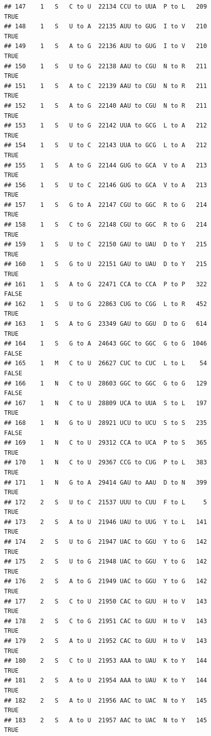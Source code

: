 \documentclass[
  12pt,
]{article}
\begin{document}
\begin{verbatim}
## 147    1   S   C to U  22134 CCU to UUA  P to L   209           TRUE
## 148    1   S   U to A  22135 AUU to GUG  I to V   210           TRUE
## 149    1   S   A to G  22136 AUU to GUG  I to V   210           TRUE
## 150    1   S   U to G  22138 AAU to CGU  N to R   211           TRUE
## 151    1   S   A to C  22139 AAU to CGU  N to R   211           TRUE
## 152    1   S   A to G  22140 AAU to CGU  N to R   211           TRUE
## 153    1   S   U to G  22142 UUA to GCG  L to A   212           TRUE
## 154    1   S   U to C  22143 UUA to GCG  L to A   212           TRUE
## 155    1   S   A to G  22144 GUG to GCA  V to A   213           TRUE
## 156    1   S   U to C  22146 GUG to GCA  V to A   213           TRUE
## 157    1   S   G to A  22147 CGU to GGC  R to G   214           TRUE
## 158    1   S   C to G  22148 CGU to GGC  R to G   214           TRUE
## 159    1   S   U to C  22150 GAU to UAU  D to Y   215           TRUE
## 160    1   S   G to U  22151 GAU to UAU  D to Y   215           TRUE
## 161    1   S   A to G  22471 CCA to CCA  P to P   322          FALSE
## 162    1   S   U to G  22863 CUG to CGG  L to R   452           TRUE
## 163    1   S   A to G  23349 GAU to GGU  D to G   614           TRUE
## 164    1   S   G to A  24643 GGC to GGC  G to G  1046          FALSE
## 165    1   M   C to U  26627 CUC to CUC  L to L    54          FALSE
## 166    1   N   C to U  28603 GGC to GGC  G to G   129          FALSE
## 167    1   N   C to U  28809 UCA to UUA  S to L   197           TRUE
## 168    1   N   G to U  28921 UCU to UCU  S to S   235          FALSE
## 169    1   N   C to U  29312 CCA to UCA  P to S   365           TRUE
## 170    1   N   C to U  29367 CCG to CUG  P to L   383           TRUE
## 171    1   N   G to A  29414 GAU to AAU  D to N   399           TRUE
## 172    2   S   U to C  21537 UUU to CUU  F to L     5           TRUE
## 173    2   S   A to U  21946 UAU to UUG  Y to L   141           TRUE
## 174    2   S   U to G  21947 UAC to GGU  Y to G   142           TRUE
## 175    2   S   U to G  21948 UAC to GGU  Y to G   142           TRUE
## 176    2   S   A to G  21949 UAC to GGU  Y to G   142           TRUE
## 177    2   S   C to U  21950 CAC to GUU  H to V   143           TRUE
## 178    2   S   C to G  21951 CAC to GUU  H to V   143           TRUE
## 179    2   S   A to U  21952 CAC to GUU  H to V   143           TRUE
## 180    2   S   C to U  21953 AAA to UAU  K to Y   144           TRUE
## 181    2   S   A to U  21954 AAA to UAU  K to Y   144           TRUE
## 182    2   S   A to U  21956 AAC to UAC  N to Y   145           TRUE
## 183    2   S   A to U  21957 AAC to UAC  N to Y   145           TRUE

\end{verbatim}
\end{document}
